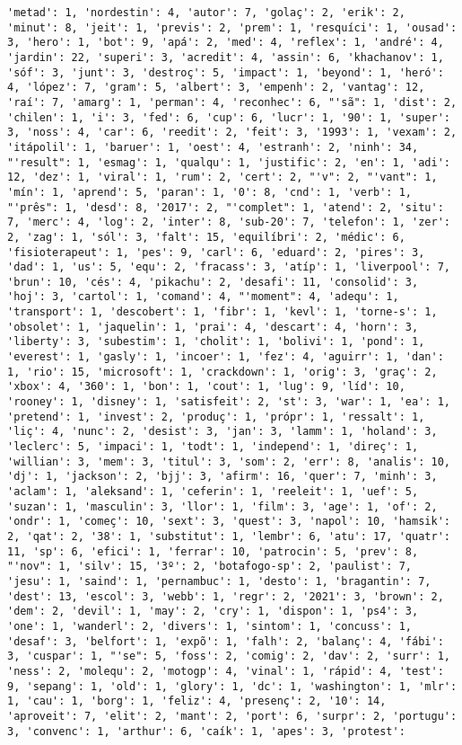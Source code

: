 \documentclass[11pt]{article}
\begin{document}
\begin{Verbatim}[commandchars=\\\{\}]
'metad': 1, 'nordestin': 4, 'autor': 7, 'golaç': 2, 'erik': 2, 'minut': 8, 'jeit': 1, 'previs': 2, 'prem': 1, 'resquíci': 1, 'ousad': 3, 'hero': 1, 'bot': 9, 'apá': 2, 'med': 4, 'reflex': 1, 'andré': 4, 'jardin': 22, 'superi': 3, 'acredit': 4, 'assin': 6, 'khachanov': 1, 'sóf': 3, 'junt': 3, 'destroç': 5, 'impact': 1, 'beyond': 1, 'heró': 4, 'lópez': 7, 'gram': 5, 'albert': 3, 'empenh': 2, 'vantag': 12, 'raí': 7, 'amarg': 1, 'perman': 4, 'reconhec': 6, "'sã": 1, 'dist': 2, 'chilen': 1, 'i': 3, 'fed': 6, 'cup': 6, 'lucr': 1, '90': 1, 'super': 3, 'noss': 4, 'car': 6, 'reedit': 2, 'feit': 3, '1993': 1, 'vexam': 2, 'itápolil': 1, 'baruer': 1, 'oest': 4, 'estranh': 2, 'ninh': 34, "'result": 1, 'esmag': 1, 'qualqu': 1, 'justific': 2, 'en': 1, 'adi': 12, 'dez': 1, 'viral': 1, 'rum': 2, 'cert': 2, "'v": 2, "'vant": 1, 'mín': 1, 'aprend': 5, 'paran': 1, '0': 8, 'cnd': 1, 'verb': 1, "'prês": 1, 'desd': 8, '2017': 2, "'complet": 1, 'atend': 2, 'situ': 7, 'merc': 4, 'log': 2, 'inter': 8, 'sub-20': 7, 'telefon': 1, 'zer': 2, 'zag': 1, 'sól': 3, 'falt': 15, 'equilíbri': 2, 'médic': 6, 'fisioterapeut': 1, 'pes': 9, 'carl': 6, 'eduard': 2, 'pires': 3, 'dad': 1, 'us': 5, 'equ': 2, 'fracass': 3, 'atíp': 1, 'liverpool': 7, 'brun': 10, 'cés': 4, 'pikachu': 2, 'desafi': 11, 'consolid': 3, 'hoj': 3, 'cartol': 1, 'comand': 4, "'moment": 4, 'adequ': 1, 'transport': 1, 'descobert': 1, 'fibr': 1, 'kevl': 1, 'torne-s': 1, 'obsolet': 1, 'jaquelin': 1, 'prai': 4, 'descart': 4, 'horn': 3, 'liberty': 3, 'subestim': 1, 'cholit': 1, 'bolivi': 1, 'pond': 1, 'everest': 1, 'gasly': 1, 'incoer': 1, 'fez': 4, 'aguirr': 1, 'dan': 1, 'rio': 15, 'microsoft': 1, 'crackdown': 1, 'orig': 3, 'graç': 2, 'xbox': 4, '360': 1, 'bon': 1, 'cout': 1, 'lug': 9, 'líd': 10, 'rooney': 1, 'disney': 1, 'satisfeit': 2, 'st': 3, 'war': 1, 'ea': 1, 'pretend': 1, 'invest': 2, 'produç': 1, 'própr': 1, 'ressalt': 1, 'liç': 4, 'nunc': 2, 'desist': 3, 'jan': 3, 'lamm': 1, 'holand': 3, 'leclerc': 5, 'impaci': 1, 'todt': 1, 'independ': 1, 'direç': 1, 'willian': 3, 'mem': 3, 'titul': 3, 'som': 2, 'err': 8, 'analis': 10, 'dj': 1, 'jackson': 2, 'bjj': 3, 'afirm': 16, 'quer': 7, 'minh': 3, 'aclam': 1, 'aleksand': 1, 'ceferin': 1, 'reeleit': 1, 'uef': 5, 'suzan': 1, 'masculin': 3, 'llor': 1, 'film': 3, 'age': 1, 'of': 2, 'ondr': 1, 'começ': 10, 'sext': 3, 'quest': 3, 'napol': 10, 'hamsik': 2, 'qat': 2, '38': 1, 'substitut': 1, 'lembr': 6, 'atu': 17, 'quatr': 11, 'sp': 6, 'efici': 1, 'ferrar': 10, 'patrocin': 5, 'prev': 8, "'nov": 1, 'silv': 15, '3º': 2, 'botafogo-sp': 2, 'paulist': 7, 'jesu': 1, 'saind': 1, 'pernambuc': 1, 'desto': 1, 'bragantin': 7, 'dest': 13, 'escol': 3, 'webb': 1, 'regr': 2, '2021': 3, 'brown': 2, 'dem': 2, 'devil': 1, 'may': 2, 'cry': 1, 'dispon': 1, 'ps4': 3, 'one': 1, 'wanderl': 2, 'divers': 1, 'sintom': 1, 'concuss': 1, 'desaf': 3, 'belfort': 1, 'expõ': 1, 'falh': 2, 'balanç': 4, 'fábi': 3, 'cuspar': 1, "'se": 5, 'foss': 2, 'comig': 2, 'dav': 2, 'surr': 1, 'ness': 2, 'molequ': 2, 'motogp': 4, 'vinal': 1, 'rápid': 4, 'test': 9, 'sepang': 1, 'old': 1, 'glory': 1, 'dc': 1, 'washington': 1, 'mlr': 1, 'cau': 1, 'borg': 1, 'feliz': 4, 'presenç': 2, '10': 14, 'aproveit': 7, 'elit': 2, 'mant': 2, 'port': 6, 'surpr': 2, 'portugu': 3, 'convenc': 1, 'arthur': 6, 'caík': 1, 'apes': 3, 'protest': 
\end{Verbatim}
\end{document}
